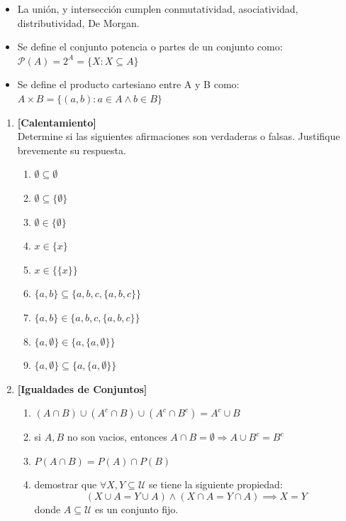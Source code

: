 \documentclass[letterpaper,11pt]{article}
\newcommand{\U}{\mathcal U}
\theoremstyle{plain}
\begin{document}
\begin{framed}
\begin{multicols}{2}
\begin{itemize}
                \item La unión, y intersección cumplen conmutatividad, asociatividad, distributividad, De Morgan.
                \item  Se define el conjunto potencia o partes de un conjunto como:
                $\mathcal{P}(A)=2^{A}=\{X:X\subseteq A\}$
                \item Se define el producto cartesiano entre A y B como:
                $A \times B=\{(a,b): a\in A \land b \in B \}$
            \end{itemize}	
        \end{multicols}
\end{framed}

\begin{enumerate}[\bf P1.]
    \item \textbf{[Calentamiento]}\\
    Determine si las siguientes afirmaciones son verdaderas o falsas. Justifique brevemente su respuesta.
        \begin{multicols}{3}
            \begin{enumerate}
                \item $\emptyset \subseteq \emptyset$
    	        \item $\emptyset \subseteq  \{ \emptyset \}$
    	        \item $\emptyset  \in \{ \emptyset \}$
    	        \item $ x \in \{x\}$
    	        \item $ x \in \{\{x\}\}$
    	        \item $ \{a,b\} \subseteq \{a,b,c, \{a,b,c \} \} $
    	        \item $ \{a,b\} \in \{a,b,c, \{a,b,c \} \} $
    	        \item $ \{a,\emptyset \} \in \{a,\{a, \emptyset \} \}$
    	        \item $ \{a,\emptyset \} \subseteq  \{a,\{a, \emptyset \} \}$
            \end{enumerate}
        \end{multicols} 
    
    \item \textbf{[Igualdades de Conjuntos]}
        \begin{enumerate}
            \item $(A \cap B) \cup (A^{c} \cap B) \cup (A^{c} \cap B^{c}) = A^{c}\cup B$
            \item si $A,B$ no son vacios, entonces $ A\cap B = \emptyset \Longrightarrow A \cup B^{c}=B^{c}$
            \item $P(A\cap B)=P(A)\cap P(B)$
            \item demostrar que $\forall X,Y \subseteq \U$ se tiene la siguiente propiedad:
	    $$
	    (X \cup A = Y \cup A) \land (X \cap A = Y \cap A) \implies X=Y
	    $$
	    donde $A \subseteq \U$ es un conjunto fijo.
        \end{enumerate}
        

\end{enumerate}
\end{document}
